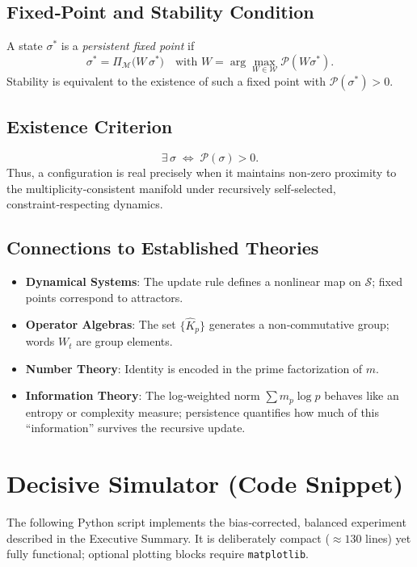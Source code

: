 \documentclass[11pt]{article}
\begin{document}
\subsection{Fixed‑Point and Stability Condition}
A state $\sigma^*$ is a \emph{persistent fixed point} if
\[
\sigma^*=\Pi_{\mathcal{M}}\bigl(W\,\sigma^*\bigr)
\quad\text{with }W=\arg\max_{W\in\mathcal{W}}\mathcal{P}(W\sigma^*).
\]
Stability is equivalent to the existence of such a fixed point with $\mathcal{P}(\sigma^*)>0$.

\subsection{Existence Criterion}
\[
\exists\,\sigma\;\Longleftrightarrow\;\mathcal{P}(\sigma)>0.
\]
Thus, a configuration is real precisely when it maintains non‑zero proximity to the multiplicity‑consistent manifold under recursively self‑selected, constraint‑respecting dynamics.

\subsection{Connections to Established Theories}
\begin{itemize}
\item \textbf{Dynamical Systems}: The update rule defines a nonlinear map on $\mathcal{S}$; fixed points correspond to attractors.
\item \textbf{Operator Algebras}: The set $\{\hat{K}_p\}$ generates a non‑commutative group; words $W_t$ are group elements.
\item \textbf{Number Theory}: Identity is encoded in the prime factorization of $m$.
\item \textbf{Information Theory}: The log‑weighted norm $\sum m_p\log p$ behaves like an entropy or complexity measure; persistence quantifies how much of this “information” survives the recursive update.
\end{itemize}

\section{Decisive Simulator (Code Snippet)}
\label{sec:code}
The following Python script implements the bias‑corrected, balanced experiment described in the Executive Summary.  It is deliberately compact ($\approx130$ lines) yet fully functional; optional plotting blocks require \texttt{matplotlib}.
\end{document}
